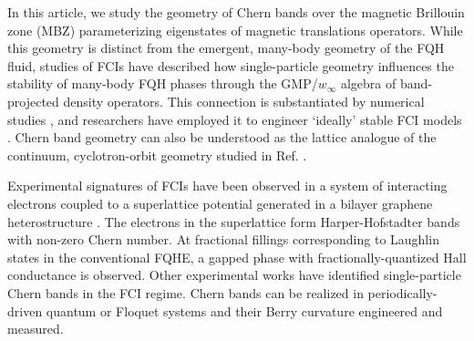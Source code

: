 \documentclass[aps,prb,twocolumn,letterpaper,twoside,nobalancelastpage,groupedaddress,amsmath,amssymb,floatfix,citeautoscript]{revtex4-1}
\begin{document}
 In this article, we study the geometry of Chern bands over the magnetic Brillouin zone (MBZ) parameterizing eigenstates of magnetic translations operators\cite{zak_magnetic_1964}. While this geometry is distinct from the emergent, many-body geometry of the FQH fluid, studies of FCIs have described how single-particle geometry influences the stability of many-body FQH phases through the GMP/$w_{\infty}$ algebra of band-projected density operators.\cite{Girvin:1986bu,parameswaran_fractional_2012,parameswaran_fractional_2013, roy_band_2014} This connection is substantiated by numerical studies \cite{jackson_geometric_2015,Claassen2015,bauer_quantum_2016}, and researchers have employed it to engineer `ideally' stable FCI models \cite{Lee2017}. Chern band geometry can also be understood as the lattice analogue of the continuum, cyclotron-orbit geometry studied in Ref. .

 Experimental signatures of FCIs have been observed in a system of interacting electrons coupled to a superlattice potential generated in a bilayer graphene heterostructure \cite{Spantoneaan8458}. The electrons in the superlattice form Harper-Hofstadter bands with non-zero Chern number. At fractional fillings corresponding to Laughlin states in the conventional FQHE, a gapped phase with fractionally-quantized Hall conductance is observed. \cite{Spantoneaan8458} Other experimental works have identified single-particle Chern bands in the FCI regime. \cite{Jotzu2014,Aidelsburger:2014hm,Aidelsburger:2013ew} Chern bands can be realized in periodically-driven quantum or Floquet systems and their Berry curvature engineered and measured.\cite{Flaschner1091}

\end{document}
